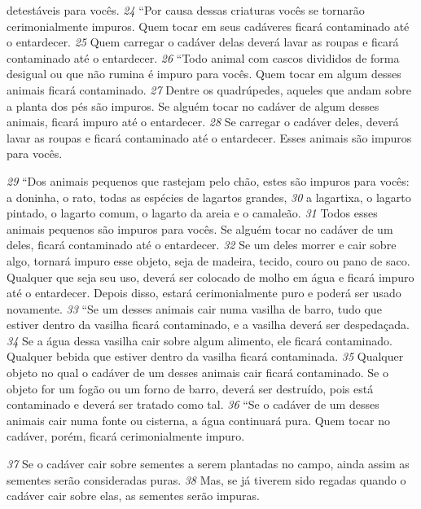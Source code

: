 detestáveis para vocês.
\textit{\tiny 24}
“Por causa dessas criaturas vocês se tornarão cerimonialmente impuros.
Quem tocar em seus cadáveres ficará contaminado até o entardecer. 
\textit{\tiny 25}
Quem
carregar o cadáver delas deverá lavar as roupas e ficará contaminado até o
entardecer.
\textit{\tiny 26}
“Todo animal com cascos divididos de forma desigual ou que não rumina é
impuro para vocês. Quem tocar em algum desses animais ficará contaminado.
\textit{\tiny 27}
Dentre os quadrúpedes, aqueles que andam sobre a planta dos pés são impuros.
Se alguém tocar no cadáver de algum desses animais, ficará impuro até o
entardecer. 
\textit{\tiny 28}
Se carregar o cadáver deles, deverá lavar as roupas e ficará
contaminado até o entardecer. Esses animais são impuros para vocês.
   
\bigskip
\textit{\tiny 29}
“Dos animais pequenos que rastejam pelo chão, estes são impuros para vocês:
a doninha, o rato, todas as espécies de lagartos grandes, 
\textit{\tiny 30}
a lagartixa, o lagarto
pintado, o lagarto comum, o lagarto da areia e o camaleão. 
\textit{\tiny 31}
Todos esses animais
pequenos são impuros para vocês. Se alguém tocar no cadáver de um deles, ficará
contaminado até o entardecer. 
\textit{\tiny 32}
Se um deles morrer e cair sobre algo, tornará
impuro esse objeto, seja de madeira, tecido, couro ou pano de saco. Qualquer que
seja seu uso, deverá ser colocado de molho em água e ficará impuro até o
entardecer. Depois disso, estará cerimonialmente puro e poderá ser usado
novamente.
\textit{\tiny 33}
“Se um desses animais cair numa vasilha de barro, tudo que estiver dentro da
vasilha ficará contaminado, e a vasilha deverá ser despedaçada. 
\textit{\tiny 34}
Se a água dessa
vasilha cair sobre algum alimento, ele ficará contaminado. Qualquer bebida que
estiver dentro da vasilha ficará contaminada. 
\textit{\tiny 35}
Qualquer objeto no qual o cadáver
de um desses animais cair ficará contaminado. Se o objeto for um fogão ou um
forno de barro, deverá ser destruído, pois está contaminado e deverá ser tratado
como tal.
\textit{\tiny 36}
“Se o cadáver de um desses animais cair numa fonte ou cisterna, a água
continuará pura. Quem tocar no cadáver, porém, ficará cerimonialmente impuro.

\textit{\tiny 37}
Se o cadáver cair sobre sementes a serem plantadas no campo, ainda assim as
sementes serão consideradas puras. 
\textit{\tiny 38}
Mas, se já tiverem sido regadas quando o
cadáver cair sobre elas, as sementes serão impuras.
   
